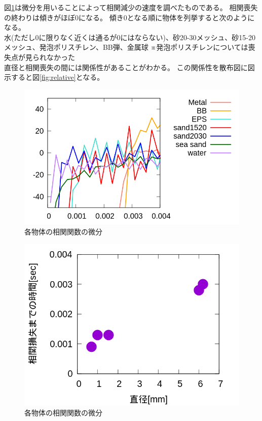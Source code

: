 \documentclass[a4paper,10pt,twocolumn,dvipdfmx]{jsarticle}
\begin{document}
図\ref{fig:diff}は微分を用いることによって相関減少の速度を調べたものである。
相関喪失の終わりは傾きがほぼ0になる。
傾き0となる順に物体を列挙すると次のようになる。\\
水(ただし0に限りなく近くは通るが0にはならない)、砂20-30メッシュ、砂15-20メッシュ、発泡ポリスチレン、BB弾、金属球 ※発泡ポリスチレンについては喪失点が見られなかった\\
直径と相関喪失の間には関係性があることがわかる。
この関係性を散布図に図示すると図\ref{fig:relative}となる。

\begin{figure}[H]
	\includegraphics[scale=0.4]{diff.png}
	\caption{各物体の相関関数の微分}
	\label{fig:diff}
\end{figure}
\begin{figure}[H]
	\includegraphics[scale=0.4]{zeropoint.png}
	\caption{各物体の相関関数の微分}
	\label{fig:zero}
\end{figure}
\end{document}
